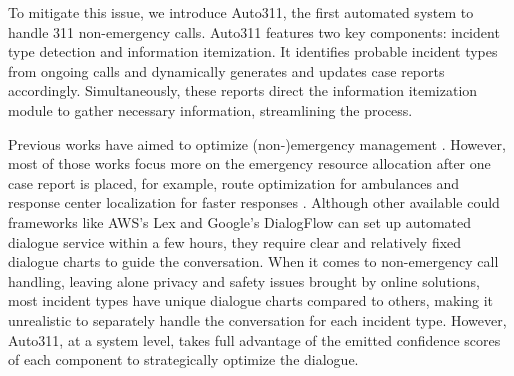 

To mitigate this issue, we introduce Auto311, the first automated system to handle 311 non-emergency calls. Auto311 features two key components: incident type detection and information itemization. It identifies probable incident types from ongoing calls and dynamically generates and updates case reports accordingly. Simultaneously, these reports direct the information itemization module to gather necessary information, streamlining the process.


Previous works have aimed to optimize (non-)emergency management \cite{sun2020applications, wex2014emergency, manoj2007communication, 
ma2021novel, 
ma2021toward, 
ma2018cityresolver, 
chen2008coordination}. However, most of those works focus more on the emergency resource allocation after one case report is placed, for example, route optimization for ambulances and response center localization for faster responses \cite{mukhopadhyay2022review}. Although other available could frameworks like AWS's Lex \cite{amazonlex} and Google's DialogFlow \cite{dialogflow} can set up automated dialogue service within a few hours, they require clear and relatively fixed dialogue charts to guide the conversation. When it comes to non-emergency call handling, leaving alone privacy and safety issues brought by online solutions, most incident types have unique dialogue charts compared to others, making it unrealistic to separately handle the conversation for each incident type. However, Auto311, at a system level, takes full advantage of the emitted confidence scores of each component to strategically optimize the dialogue. 

